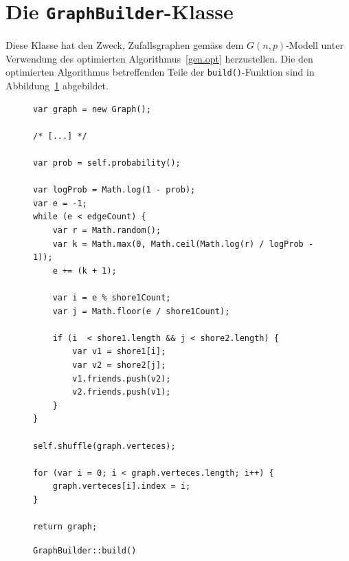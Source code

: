 \documentclass[11pt,abstracton]{scrreprt} %
\theoremstyle{definition}
\begin{document}
\section{Die {\tt GraphBuilder}-Klasse}

Diese Klasse hat den Zweck, Zufallsgraphen gemäss dem $G(n,p)$-Modell unter Verwendung des optimierten Algorithmus~\ref{gen.opt} herzustellen. Die den optimierten Algorithmus betreffenden Teile der {\tt build()}-Funktion sind in Abbildung~\ref{code.build} abgebildet.

\begin{figure}
\caption{{\tt GraphBuilder::build()}}
\label{code.build}

\begin{lstlisting}
var graph = new Graph();

/* [...] */

var prob = self.probability();
		
var logProb = Math.log(1 - prob);
var e = -1;
while (e < edgeCount) {
	var r = Math.random();
	var k = Math.max(0, Math.ceil(Math.log(r) / logProb - 1));
	e += (k + 1);
			
	var i = e % shore1Count;
	var j = Math.floor(e / shore1Count);
			
	if (i  < shore1.length && j < shore2.length) {
		var v1 = shore1[i];
		var v2 = shore2[j];
		v1.friends.push(v2);
		v2.friends.push(v1);					
	}
}

self.shuffle(graph.verteces);
		
for (var i = 0; i < graph.verteces.length; i++) {
	graph.verteces[i].index = i;
}

return graph;

\end{lstlisting}
\end{figure}




\listoffigures
\listofalgorithms
\end{document}
